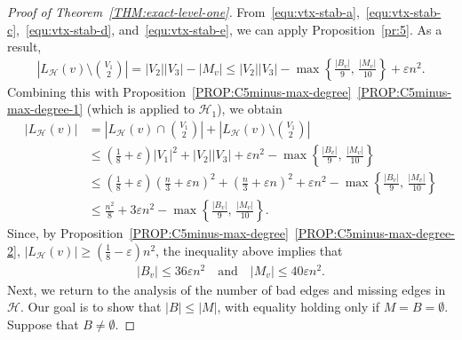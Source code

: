 \documentclass[11pt,a4paper]{article}
\theoremstyle{remark}
\begin{document}
\begin{proof}[Proof of Theorem~\ref{THM:exact-level-one}]
    From~\eqref{equ:vtx-stab-a},~\eqref{equ:vtx-stab-c},~\eqref{equ:vtx-stab-d}, and~\eqref{equ:vtx-stab-e}, we can apply Proposition~\ref{pr:5}. As a result, 
    \begin{align*}
        \left|L_{\mathcal{H}}(v) \setminus \binom{V_1}{2}\right|
        = |V_2||V_3| - |M_v|
        \le |V_2||V_3| - \max\left\{\frac{|B_{v}|}{9},\,\frac{|M_{v}|}{10}\right\} + \varepsilon n^2. 
    \end{align*}
    Combining this with Proposition~\ref{PROP:C5minus-max-degree}~\ref{PROP:C5minus-max-degree-1} (which is applied to $\mathcal{H}_1$), we obtain  
    \begin{align*}
        |L_{\mathcal{H}}(v)|
        & = \left|L_{\mathcal{H}}(v) \cap \binom{V_1}{2}\right| + \left|L_{\mathcal{H}}(v) \setminus \binom{V_1}{2}\right| \\
        & \le \left(\frac{1}{8}+\varepsilon\right)|V_1|^2 + |V_2||V_3| + \varepsilon n^2 - \max\left\{\frac{|B_{v}|}{9},\,\frac{|M_{v}|}{10}\right\} \\
        & \le \left(\frac{1}{8}+\varepsilon\right) \left(\frac{n}{3}+\varepsilon n\right)^2 + \left(\frac{n}{3}+\varepsilon n\right)^2  + \varepsilon n^2 - \max\left\{\frac{|B_{v}|}{9},\,\frac{|M_{v}|}{10}\right\} \\ 
        & \le \frac{n^2}{8} + 3\varepsilon n^2 - \max\left\{\frac{|B_{v}|}{9},\,\frac{|M_{v}|}{10}\right\}. 
    \end{align*}
    Since, by Proposition~\ref{PROP:C5minus-max-degree}~\ref{PROP:C5minus-max-degree-2}, $|L_{\mathcal{H}}(v)| \ge \left(\frac{1}{8}-\varepsilon\right) n^2$, the inequality above implies that 
    \begin{align}\label{equ:Bv-upper-bound}
        |B_v| 
        \le 36\varepsilon n^2 
        \quad\text{and}\quad 
        |M_{v}| 
        \le 40 \varepsilon n^2. 
    \end{align}
    Next, we return to the analysis of the number of bad edges and missing edges in $\mathcal{H}$.
    Our goal is to show that $|B| \le |M|$, with equality holding only if $M = B = \emptyset$. 
    Suppose that $B\neq \emptyset$. 


\end{proof}
\end{document}
